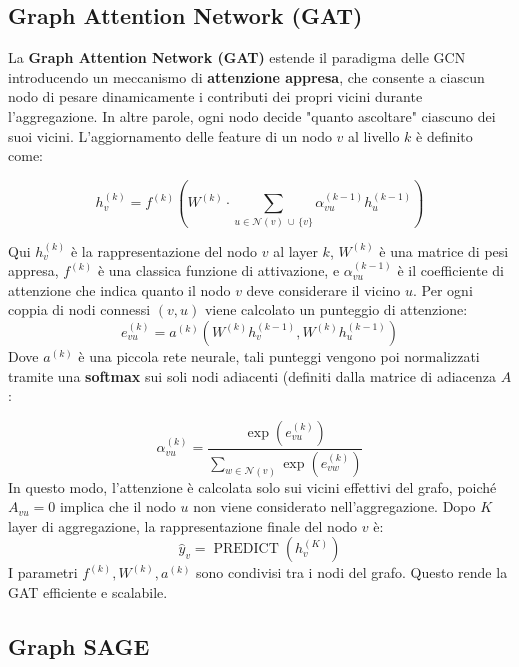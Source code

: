 \subsection{Graph Attention Network (GAT)}
La \textbf{Graph Attention Network (GAT)} estende il paradigma delle GCN introducendo un meccanismo di \textbf{attenzione appresa}, che consente a ciascun nodo di pesare dinamicamente i contributi dei propri vicini durante l’aggregazione. In altre parole, ogni nodo decide "quanto ascoltare" ciascuno dei suoi vicini. L’aggiornamento delle feature di un nodo $v$ al livello $k$ è definito come:

\[
    h_v^{(k)} = f^{(k)}\left(W^{(k)} \cdot \sum_{u \in \mathcal{N}(v)\,\cup\, \{v\}} \alpha_{vu}^{(k-1)} h_u^{(k-1)}\right)
\]

Qui $h_v^{(k)}$ è la rappresentazione del nodo $v$ al layer $k$, $W^{(k)}$ è una matrice di pesi appresa, $f^{(k)}$ è una classica funzione di attivazione, e $\alpha_{vu}^{(k-1)}$ è il coefficiente di attenzione che indica quanto il nodo $v$ deve considerare il vicino $u$. Per ogni coppia di nodi connessi $(v,u)$ viene calcolato un punteggio di attenzione:
\begin{equation*}
    e_{vu}^{(k)} = a^{(k)}(W^{(k)}h_v^{(k-1)}, W^{(k)}h_u^{(k-1)})
\end{equation*}
Dove $a^{(k)}$ è una piccola rete neurale, tali punteggi vengono poi normalizzati tramite una \textbf{softmax} sui soli nodi adiacenti (definiti dalla matrice di adiacenza $A$:

\[
    \alpha_{vu}^{(k)} = \frac{\operatorname{exp}(e_{vu}^{(k)})}{\sum_{w\in\mathcal{N}(v)}\operatorname{exp}(e_{vw}^{(k)})}
\]
In questo modo, l’attenzione è calcolata solo sui vicini effettivi del grafo, poiché $A_{vu}=0$ implica che il nodo $u$ non viene considerato nell’aggregazione. Dopo $K$ layer di aggregazione, la rappresentazione finale del nodo $v$ è:
\[
    \hat y_v = \operatorname{PREDICT}(h_v^{(K)})
\]
I parametri \( f^{(k)}, W^{(k)}, a^{(k)} \) sono condivisi tra i nodi del grafo. Questo rende la GAT efficiente e scalabile.

\subsection{Graph SAGE}

